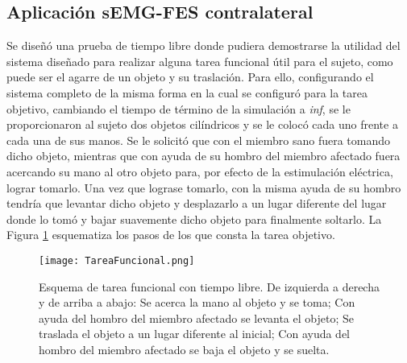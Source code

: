 \subsection{Aplicación sEMG-FES contralateral}
Se diseñó una prueba de tiempo libre donde pudiera demostrarse la utilidad del sistema diseñado para realizar alguna tarea funcional útil para el sujeto, como puede ser el agarre de un objeto y su traslación. Para ello, configurando el sistema completo de la misma forma en la cual se configuró para la tarea objetivo, cambiando el tiempo de término de la simulación a \emph{inf}, se le proporcionaron al sujeto dos objetos cilíndricos y se le colocó cada uno frente a cada una de sus manos. Se le solicitó que con el miembro sano fuera tomando dicho objeto, mientras que con ayuda de su hombro del miembro afectado fuera acercando su mano al otro objeto para, por efecto de la estimulación eléctrica, lograr tomarlo. Una vez que lograse tomarlo, con la misma ayuda de su hombro tendría que levantar dicho objeto y desplazarlo a un lugar diferente del lugar donde lo tomó y bajar suavemente dicho objeto para finalmente soltarlo. La Figura \ref{Figura: TareaFuncional_P} esquematiza los pasos de los que consta la tarea objetivo.

\begin{figure}[htbp]
	\centering
	\texttt{[image: TareaFuncional.png]}
	\caption[Esquema de tarea funcional con tiempo libre.]{Esquema de tarea funcional con tiempo libre. De izquierda a derecha y de arriba a abajo: Se acerca la mano al objeto y se toma; Con ayuda del hombro del miembro afectado se levanta el objeto; Se traslada el objeto a un lugar diferente al inicial; Con ayuda del hombro del miembro afectado se baja el objeto y se suelta.}
	\label{Figura: TareaFuncional_P}
\end{figure}


